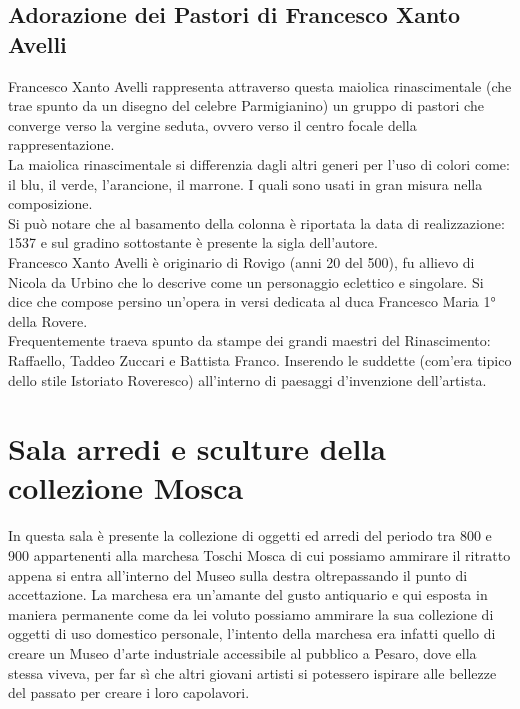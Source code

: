 \documentclass[hidelinks,12pt,a4paper]{article}
\begin{document}
\begin{flushleft}
			\subsection{Adorazione dei Pastori di Francesco Xanto Avelli}
			Francesco Xanto Avelli rappresenta attraverso questa maiolica rinascimentale (che trae spunto da un disegno del celebre Parmigianino) un gruppo di pastori che converge verso la vergine seduta, ovvero verso il centro focale della rappresentazione.\\
			La maiolica rinascimentale si differenzia dagli altri generi per l'uso di colori come: il blu, il verde, l’arancione, il marrone. I quali sono usati in gran misura nella composizione.\\
			Si può notare che al basamento della colonna è riportata la data di realizzazione: 1537 e sul gradino sottostante è presente la sigla dell'autore.\\
			Francesco Xanto Avelli è originario di Rovigo (anni 20 del 500), fu allievo di Nicola da Urbino che lo descrive come un personaggio eclettico e singolare. Si dice che compose persino un’opera in versi dedicata al duca Francesco Maria 1° della Rovere.\\
			Frequentemente traeva spunto da stampe dei grandi maestri del Rinascimento: Raffaello, Taddeo Zuccari e Battista Franco. Inserendo le suddette (com'era tipico dello stile Istoriato Roveresco) all'interno di paesaggi d'invenzione dell'artista.
	
			\section{Sala arredi e sculture della collezione Mosca}
			In questa sala è presente la collezione di oggetti ed arredi del periodo tra 800 e 900 appartenenti alla marchesa  Toschi Mosca di cui possiamo ammirare il ritratto appena si entra all'interno del Museo sulla destra oltrepassando il punto di accettazione. La marchesa era un'amante del gusto antiquario e qui esposta in maniera permanente come da lei voluto possiamo ammirare la sua collezione di oggetti di uso domestico personale, l'intento della marchesa era infatti quello di creare un Museo d'arte industriale accessibile al pubblico a Pesaro, dove ella stessa viveva, per far sì che altri giovani artisti si potessero ispirare alle bellezze del passato per creare i loro capolavori.
	

\end{flushleft}
\end{document}
